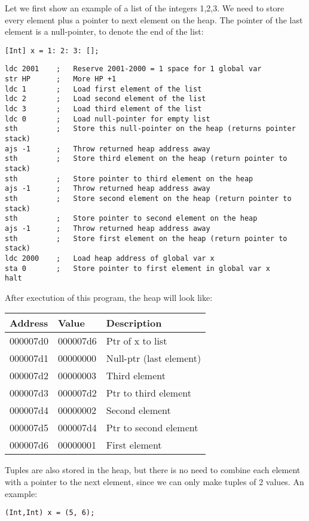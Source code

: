 \documentclass[a4paper]{article}
\begin{document}
Let we first show an example of a list of the integers 1,2,3. We need to store every element plus a pointer to next element on the heap. The pointer of the last element is a null-pointer, to denote the end of the list:
\begin{lstlisting}
[Int] x = 1: 2: 3: [];
\end{lstlisting}
\begin{lstlisting}
ldc 2001	;	Reserve 2001-2000 = 1 space for 1 global var
str HP		;	More HP +1
ldc 1		;	Load first element of the list
ldc 2		;	Load second element of the list
ldc 3		;	Load third element of the list
ldc 0		;	Load null-pointer for empty list
sth			;	Store this null-pointer on the heap (returns pointer stack)
ajs -1		;	Throw returned heap address away
sth			;	Store third element on the heap (return pointer to stack)
sth			;	Store pointer to third element on the heap
ajs -1		;	Throw returned heap address away
sth			;	Store second element on the heap (return pointer to stack)
sth			;	Store pointer to second element on the heap
ajs -1		;	Throw returned heap address away
sth			;	Store first element on the heap (return pointer to stack)
ldc 2000	;	Load heap address of global var x
sta 0		;	Store pointer to first element in global var x
halt
\end{lstlisting}
After exectution of this program, the heap will look like:

\begin{tabular}{|l|l|l|}
	\hline
	Address & Value & Description \\
	\hline
	000007d0 & 000007d6 & Ptr of x to list \\
	000007d1 & 00000000 & Null-ptr (last element) \\
	000007d2 & 00000003 & Third element  \\
	000007d3 & 000007d2 & Ptr to third element  \\
	000007d4 & 00000002 & Second element  \\
	000007d5 & 000007d4 & Ptr to second element  \\
	000007d6 & 00000001 & First element  \\
	\hline
\end{tabular}

Tuples are also stored in the heap, but there is no need to combine each element with a pointer to the next element, since we can only make tuples of 2 values. An example:
\begin{lstlisting}
(Int,Int) x = (5, 6);
\end{lstlisting}
\end{document}
